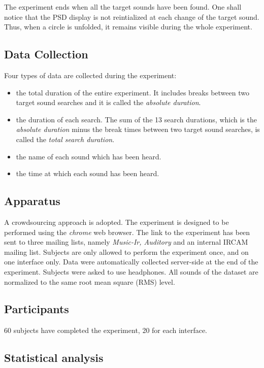 \documentclass{aes2e}
\begin{document}
The experiment ends when all the target sounds have been found. One shall notice that the PSD display is not reintialized at each change of the target sound. Thus, when a circle is unfolded, it remains visible during the whole experiment.

\subsection{Data Collection}
Four types of data are collected during the experiment:
\begin{itemize}
\item the total duration of the entire experiment. It includes breaks between two target sound searches and it is called the \textit{absolute duration}.
\item the duration of each search. The sum of the 13 search durations, which is the \textit{absolute duration} minus the break times between two target sound searches, is called the \textit{total search duration}.
\item the name of each sound which has been heard.
\item the time at which each sound has been heard.  
\end{itemize}

\subsection{Apparatus}

A crowdsourcing approach is adopted. The experiment is designed to be performed using the  \textit{chrome} web browser. The link to the experiment has been sent to three  mailing lists, namely \textit{Music-Ir, Auditory} and an internal IRCAM mailing list. Subjects are only allowed to perform the experiment once, and on one interface only. Data were automatically collected server-side at the end of the experiment. Subjects were asked to use headphones. All sounds of the dataset are normalized to the same root mean square (RMS) level.

\subsection{Participants}

60 subjects have completed the experiment, 20 for each interface.

\subsection{Statistical analysis}
\end{document}
